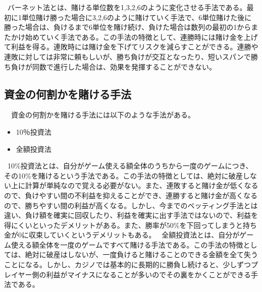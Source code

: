\ バーネット法とは、賭ける単位数を1,3,2,6のように変化させる手法である。最初に1単位賭け勝った場合に3,2,6のように賭けていく手法で、6単位賭けた後に勝った場合は、負けるまで6単位を賭け続け、負けた場合は数列の最初の1からまたかけ始めていく手法である。この手法の特徴として、連勝時には賭け金を上げて利益を得る。連敗時には賭け金を下げてリスクを減らすことができる。連勝や連敗に対しては非常に頼もしいが、勝ち負けが交互となったり、短いスパンで勝ち負けが同数で進行した場合は、効果を発揮することができない。\\

\subsection{資金の何割かを賭ける手法}
　資金の何割かを賭ける手法には以下のような手法がある。
  \begin{itemize}
 \item 10％投資法
 \item 全額投資法
 \end{itemize}
\ 10\%投資法とは、自分がゲーム使える額全体のうちから一度のゲームにつき、その10\%を賭けるという手法である。この手法の特徴としては、絶対に破産しない上に計算が単純なので覚える必要がない。また、連敗すると賭け金が低くなるので、負けやすい間の不利益を抑えることができ、連勝すると賭け金が高くなるので、勝ちやすい間の利益が高くなる。しかし、今までのベッティング手法とは違い、負け額を確実に回収したり、利益を確実に出す手法ではないので、利益を得にくいといったデメリットがある。また、勝率が50\%を下回ってしまうと持ち金が0に収束していくというデメリットもある。
\ 全額投資法とは、自分がゲーム使える額全体を一度のゲームですべて賭ける手法である。この手法の特徴としては、絶対に破産はしないが、一度負けると賭けることのできる金額を全て失うことになる。しかし、カジノでは基本的に長期的に勝負し続けると、少しずつプレイヤー側の利益がマイナスになることが多いのでその裏をかくことができる手法である。\\

